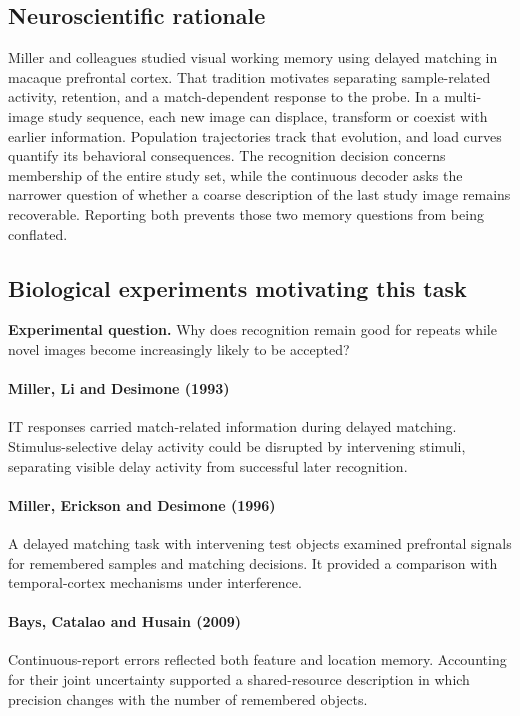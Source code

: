 \documentclass[11pt]{article}
\begin{document}
\subsection{Neuroscientific rationale}
Miller and colleagues studied visual working memory using delayed matching in macaque prefrontal cortex. That tradition motivates separating sample-related activity, retention, and a match-dependent response to the probe. In a multi-image study sequence, each new image can displace, transform or coexist with earlier information. Population trajectories track that evolution, and load curves quantify its behavioral consequences. The recognition decision concerns membership of the entire study set, while the continuous decoder asks the narrower question of whether a coarse description of the last study image remains recoverable. Reporting both prevents those two memory questions from being conflated.

\subsection{Biological experiments motivating this task}
\textbf{Experimental question.} Why does recognition remain good for repeats while novel images become increasingly likely to be accepted?

\paragraph{Miller, Li and Desimone (1993)} IT responses carried match-related information during delayed matching. Stimulus-selective delay activity could be disrupted by intervening stimuli, separating visible delay activity from successful later recognition. \cite{bio_miller93}

\paragraph{Miller, Erickson and Desimone (1996)} A delayed matching task with intervening test objects examined prefrontal signals for remembered samples and matching decisions. It provided a comparison with temporal-cortex mechanisms under interference. \cite{bio_miller96}

\paragraph{Bays, Catalao and Husain (2009)} Continuous-report errors reflected both feature and location memory. Accounting for their joint uncertainty supported a shared-resource description in which precision changes with the number of remembered objects. \cite{bio_bays}
\end{document}
